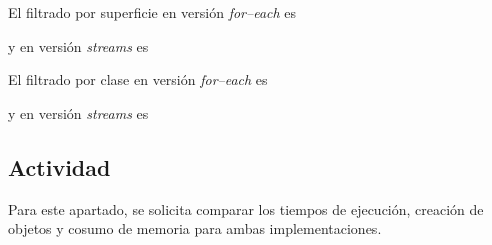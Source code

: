 El filtrado por superficie en versión \emph{for--each} es



y en versión \emph{streams} es




El filtrado por clase en versión \emph{for--each} es



y en versión \emph{streams} es




\subsection*{Actividad}

Para este apartado, se solicita comparar los tiempos de ejecución,
creación de objetos y cosumo de memoria para ambas implementaciones.
